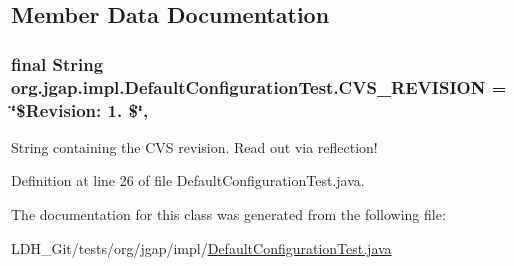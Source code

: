 \subsection{Member Data Documentation}
\hypertarget{classorg_1_1jgap_1_1impl_1_1_default_configuration_test_a00cfb58110522e10dcf3b974d8d26b96}{
\subsubsection[{C\-V\-S\-\_\-\-R\-E\-V\-I\-S\-I\-O\-N}]{\setlength{\rightskip}{0pt plus 5cm}final String org.\-jgap.\-impl.\-Default\-Configuration\-Test.\-C\-V\-S\-\_\-\-R\-E\-V\-I\-S\-I\-O\-N = \char`\"{}\$Revision\-: 1. \$\char`\"{}\hspace{0.3cm}{\ttfamily [static]}, {\ttfamily [private]}}}\label{classorg_1_1jgap_1_1impl_1_1_default_configuration_test_a00cfb58110522e10dcf3b974d8d26b96}
String containing the C\-V\-S revision. Read out via reflection! 

Definition at line 26 of file Default\-Configuration\-Test.\-java.



The documentation for this class was generated from the following file\-:\begin{DoxyCompactItemize}
\item 
L\-D\-H\-\_\-\-Git/tests/org/jgap/impl/\hyperlink{_default_configuration_test_8java}{Default\-Configuration\-Test.\-java}\end{DoxyCompactItemize}
